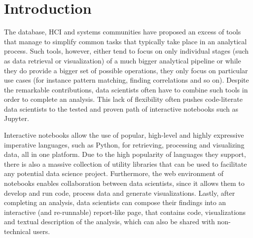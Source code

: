 \section{Introduction}
\label{section:introduction}




The database, HCI and systems communities have proposed an excess of tools that manage to simplify common tasks that typically take place in an analytical process. Such tools, however, either tend to focus on only individual stages (such as data retrieval or visualization) of a much bigger analytical pipeline or while they do provide a bigger set of possible operations, they only focus on particular use cases (for instance pattern matching, finding correlations and so on). Despite the remarkable contributions, data scientists often have to combine such tools in order to complete an analysis. This lack of flexibility often pushes code-literate data scientists to the tested and proven path of interactive notebooks such as Jupyter.

Interactive notebooks allow the use of popular, high-level and highly expressive imperative languages, such as Python, for retrieving, processing and visualizing data, all in one platform. Due to the high popularity of languages they support, there is also a massive collection of utility libraries that can be used to facilitate any potential data science project. Furthermore, the web environment of notebooks enables collaboration between data scientists, since it allows them to develop and run code, process data and generate visualizations. Lastly, after completing an analysis, data scientists can compose their findings into an interactive (and re-runnable) report-like page, that contains code, visualizations and textual description of the analysis, which can also be shared with non-technical users.


